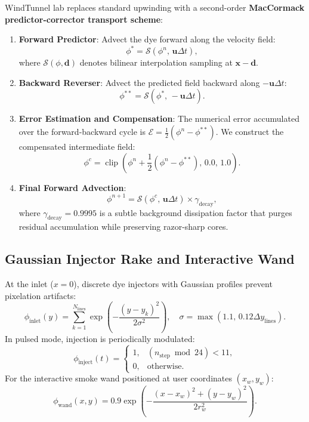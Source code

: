 \documentclass[11pt,a4paper]{article}
\begin{document}
WindTunnel lab replaces standard upwinding with a second-order \textbf{MacCormack predictor-corrector transport scheme}:
\begin{enumerate}
    \item \textbf{Forward Predictor}: Advect the dye forward along the velocity field:
    \begin{equation}
    \phi^* = \mathcal{S}(\phi^n, \, \mathbf{u}\Delta t),
    \end{equation}
    where $\mathcal{S}(\phi, \mathbf{d})$ denotes bilinear interpolation sampling at $\mathbf{x} - \mathbf{d}$.
    \item \textbf{Backward Reverser}: Advect the predicted field backward along $-\mathbf{u}\Delta t$:
    \begin{equation}
    \phi^{**} = \mathcal{S}(\phi^*, \, -\mathbf{u}\Delta t).
    \end{equation}
    \item \textbf{Error Estimation and Compensation}:
    The numerical error accumulated over the forward-backward cycle is $\mathcal{E} = \frac{1}{2}(\phi^n - \phi^{**})$. We construct the compensated intermediate field:
    \begin{equation}
    \phi^c = \operatorname{clip}\left(\phi^n + \frac{1}{2}(\phi^n - \phi^{**}), \, 0.0, \, 1.0\right).
    \end{equation}
    \item \textbf{Final Forward Advection}:
    \begin{equation}
    \phi^{n+1} = \mathcal{S}(\phi^c, \, \mathbf{u}\Delta t) \times \gamma_{\text{decay}},
    \end{equation}
    where $\gamma_{\text{decay}} = 0.9995$ is a subtle background dissipation factor that purges residual accumulation while preserving razor-sharp cores.
\end{enumerate}

\subsection{Gaussian Injector Rake and Interactive Wand}
At the inlet ($x = 0$), discrete dye injectors with Gaussian profiles prevent pixelation artifacts:
\begin{equation}
\phi_{\text{inlet}}(y) = \sum_{k=1}^{N_{\text{lines}}} \exp\left( -\frac{(y - y_k)^2}{2\sigma^2} \right), \quad \sigma = \max(1.1, \, 0.12 \Delta y_{\text{lines}}).
\end{equation}
In pulsed mode, injection is periodically modulated:
\begin{equation}
\phi_{\text{inject}}(t) = \begin{cases}
1, & (n_{\text{step}} \bmod 24) < 11, \\
0, & \text{otherwise.}
\end{cases}
\end{equation}
For the interactive smoke wand positioned at user coordinates $(x_w, y_w)$:
\begin{equation}
\phi_{\text{wand}}(x, y) = 0.9 \exp\left( -\frac{(x - x_w)^2 + (y - y_w)^2}{2 r_w^2} \right).
\end{equation}
\end{document}
